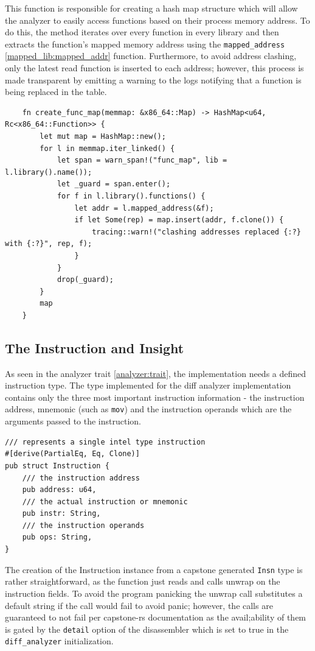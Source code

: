 This function is responsible for creating a hash map structure which will allow the analyzer to easily access functions based on their process memory address.
To do this, the method iterates over every function in every library and then extracts the function's mapped memory address using the \verb|mapped_address| \autoref{mapped_lib:mapped_addr} function.
Furthermore, to avoid address clashing, only the latest read function is inserted to each address; however, this process is made transparent by emitting a warning to the logs notifying that a function is being replaced in the table.

\begin{lstlisting}
    fn create_func_map(memmap: &x86_64::Map) -> HashMap<u64, Rc<x86_64::Function>> {
        let mut map = HashMap::new();
        for l in memmap.iter_linked() {
            let span = warn_span!("func_map", lib = l.library().name());
            let _guard = span.enter();
            for f in l.library().functions() {
                let addr = l.mapped_address(&f);
                if let Some(rep) = map.insert(addr, f.clone()) {
                    tracing::warn!("clashing addresses replaced {:?} with {:?}", rep, f);
                }
            }
            drop(_guard);
        }
        map
    }
\end{lstlisting}

\subsection{The Instruction and Insight}

As seen in the analyzer trait \autoref{analyzer:trait}, the implementation needs a defined instruction type. 
The type implemented for the diff analyzer implementation contains only the three most important instruction information - the instruction address, mnemonic (such as \verb|mov|) and the instruction operands which are the arguments passed to the instruction.

\begin{lstlisting}
/// represents a single intel type instruction
#[derive(PartialEq, Eq, Clone)]
pub struct Instruction {
    /// the instruction address
    pub address: u64,
    /// the actual instruction or mnemonic
    pub instr: String,
    /// the instruction operands
    pub ops: String,
}
\end{lstlisting}

The creation of the Instruction instance from a capstone generated \verb|Insn| type is rather straightforward, as the function just reads and calls unwrap on the instruction fields. 
To avoid the program panicking the unwrap call substitutes a default string if the call would fail to avoid panic; however, the calls are guaranteed to not fail per capstone-rs documentation as the avail;ability of them is gated by the \verb|detail| option of the disassembler which is set to true in the \verb|diff_analyzer| initialization.

